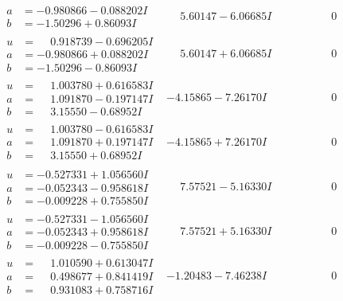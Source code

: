 \documentclass[1p]{elsarticle_modified}
\theoremstyle{definition}
\begin{document}
$$\begin{array}{c|c|c}
\begin{aligned}
a &= -0.980866 - 0.088202 I \\
b &= -1.50296 + 0.86093 I\end{aligned}
 & \phantom{-}5.60147 - 6.06685 I & \phantom{-0.000000 } 0 \\ \hline\begin{aligned}
u &= \phantom{-}0.918739 - 0.696205 I \\
a &= -0.980866 + 0.088202 I \\
b &= -1.50296 - 0.86093 I\end{aligned}
 & \phantom{-}5.60147 + 6.06685 I & \phantom{-0.000000 } 0 \\ \hline\begin{aligned}
u &= \phantom{-}1.003780 + 0.616583 I \\
a &= \phantom{-}1.091870 - 0.197147 I \\
b &= \phantom{-}3.15550 - 0.68952 I\end{aligned}
 & -4.15865 - 7.26170 I & \phantom{-0.000000 } 0 \\ \hline\begin{aligned}
u &= \phantom{-}1.003780 - 0.616583 I \\
a &= \phantom{-}1.091870 + 0.197147 I \\
b &= \phantom{-}3.15550 + 0.68952 I\end{aligned}
 & -4.15865 + 7.26170 I & \phantom{-0.000000 } 0 \\ \hline\begin{aligned}
u &= -0.527331 + 1.056560 I \\
a &= -0.052343 - 0.958618 I \\
b &= -0.009228 + 0.755850 I\end{aligned}
 & \phantom{-}7.57521 - 5.16330 I & \phantom{-0.000000 } 0 \\ \hline\begin{aligned}
u &= -0.527331 - 1.056560 I \\
a &= -0.052343 + 0.958618 I \\
b &= -0.009228 - 0.755850 I\end{aligned}
 & \phantom{-}7.57521 + 5.16330 I & \phantom{-0.000000 } 0 \\ \hline\begin{aligned}
u &= \phantom{-}1.010590 + 0.613047 I \\
a &= \phantom{-}0.498677 + 0.841419 I \\
b &= \phantom{-}0.931083 + 0.758716 I\end{aligned}
 & -1.20483 - 7.46238 I & \phantom{-0.000000 } 0 \\ \hline\begin{aligned}

\end{aligned}
\end{array}$$
\end{document}
